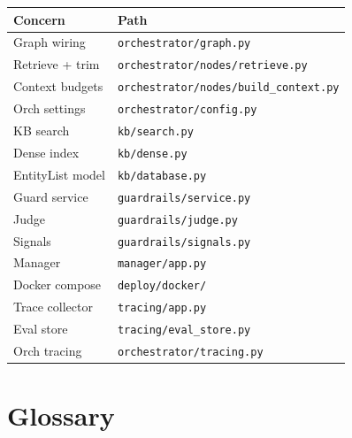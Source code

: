 \begin{longtable}[]{@{}ll@{}}
\toprule\noalign{}
Concern & Path \\
\midrule\noalign{}
\endhead
\bottomrule\noalign{}
\endlastfoot
Graph wiring & \texttt{orchestrator/graph.py} \\
Retrieve + trim & \texttt{orchestrator/nodes/retrieve.py} \\
Context budgets & \texttt{orchestrator/nodes/build\_context.py} \\
Orch settings & \texttt{orchestrator/config.py} \\
KB search & \texttt{kb/search.py} \\
Dense index & \texttt{kb/dense.py} \\
EntityList model & \texttt{kb/database.py} \\
Guard service & \texttt{guardrails/service.py} \\
Judge & \texttt{guardrails/judge.py} \\
Signals & \texttt{guardrails/signals.py} \\
Manager & \texttt{manager/app.py} \\
Docker compose & \texttt{deploy/docker/} \\
Trace collector & \texttt{tracing/app.py} \\
Eval store & \texttt{tracing/eval\_store.py} \\
Orch tracing & \texttt{orchestrator/tracing.py} \\
\end{longtable}

\section{Glossary}\label{glossary}

